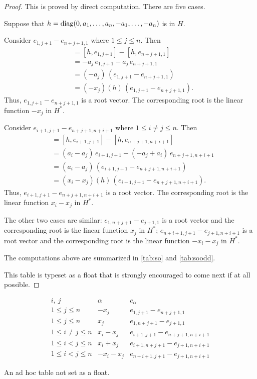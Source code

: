 \begin{proof}
  This is proved by direct computation. There are five cases.

  Suppose that $h={\operatorname{diag}(0,a_1,\dots,a_n, -a_1,\dots,-a_n)}$ is in $H$.

  Consider $e_{1, j+1}-e_{n+j+1,1}$ where $1\leq j\leq n$. Then
  \begin{align*}
    [h, e_{1, j+1}-e_{n+j+1,1}]& =[h,e_{1,j+1}] -[h,e_{n+j+1, 1}]\\
    &= -a_j\, e_{1,j+1} -a_{j} \, e_{n+j+1, 1} \\
    &= (-a_j)\, (e_{1, j+1}-e_{n+j+1,1}) \\
    &= (-x_j)(h) \, (e_{1, j+1}-e_{n+j+1,1}).
  \end{align*}
  Thus, $e_{1, j+1}-e_{n+j+1,1}$ is a root vector. The corresponding root is
  the linear function $-x_j$ in $H^*$.

  Consider $e_{i+1,j+1} -e_{n+j+1, n+i+1}$ where $1\leq i\ne j\leq n$. Then
  \begin{align*}
    [h, e_{i+1,j+1} -e_{n+j+1, n+i+1}]& =[h,e_{i+1,j+1}] -[h,e_{n+j+1,
      n+i+1}]\\
    &= (a_i-a_j)\, e_{i+1,j+1} - (-a_{j} + a_{i}) \, e_{n+j+1, n+i+1} \\
    &= (a_i-a_j)\, (e_{i+1,j+1} -e_{n+j+1, n+i+1}) \\
    &= (x_i-x_j)(h) \, (e_{i+1,j+1} -e_{n+j+1, n+i+1}).
  \end{align*}
  Thus, $e_{i+1,j+1} -e_{n+j+1, n+i+1}$ is a root vector. The corresponding
  root is the linear function $x_i-x_j$ in $H^*$.

  The other two cases are similar: $e_{1,n+j+1} -e_{j+1, 1}$ is a root
  vector and the corresponding root is the linear function $x_j$ in $H^*$;
  $e_{n+i+1,j+1} -e_{j+1, n+i+1}$ is a root vector and the corresponding
  root is the linear function $-x_i-x_j$ in $H^*$.

  The computations above are summarized in \cref{tab:so} and
  \cref{tab:soodd}. 

  This table is typeset as a float that is strongly encouraged to come next
  if at all possible.
\end{proof}


\begin{table}[h!tb]
  \small {}
  \renewcommand{\arraystretch}{1.3}
  \begin{equation*}
    \begin{array}{l|cc}
      i,\ j &\alpha &e_\alpha\\\hline
      1\leq j\leq n&-x_j & e_{1,j+1} -e_{n+j+1, 1}\\
      1\leq j\leq n&x_j & e_{1,n+j+1} -e_{j+1, 1}\\
      1\leq i\ne j\leq n&x_i-x_j &  e_{i+1,j+1} -e_{n+j+1, n+i+1} \\
      1\leq i< j\leq n&x_i+x_j & e_{i+1,n+j+1} -e_{j+1, n+i+1} \\ 
      1\leq i< j\leq n&-x_i-x_j & e_{n+i+1,j+1} -e_{j+1, n+i+1}
    \end{array}  
  \end{equation*}
  \caption{An ad hoc table not set as a float.}
  \label{tab:so}
\end{table}


